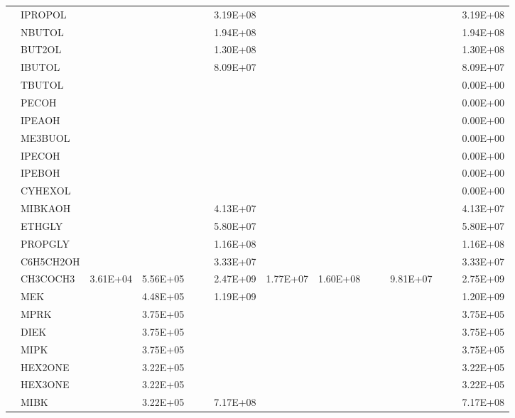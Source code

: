 \begin{longtable}{lllllllllllllll}
	 & IPROPOL &  &  &  &  & 3.19E+08 &  &  &  &  &  &  &  & 3.19E+08 \\*
	 & NBUTOL &  &  &  &  & 1.94E+08 &  &  &  &  &  &  &  & 1.94E+08 \\
	 & BUT2OL &  &  &  &  & 1.30E+08 &  &  &  &  &  &  &  & 1.30E+08 \\
	 & IBUTOL &  &  &  &  & 8.09E+07 &  &  &  &  &  &  &  & 8.09E+07 \\
	 & TBUTOL &  &  &  &  &  &  &  &  &  &  &  &  & 0.00E+00 \\
	 & PECOH &  &  &  &  &  &  &  &  &  &  &  &  & 0.00E+00 \\
	 & IPEAOH &  &  &  &  &  &  &  &  &  &  &  &  & 0.00E+00 \\
	 & ME3BUOL &  &  &  &  &  &  &  &  &  &  &  &  & 0.00E+00 \\
	 & IPECOH &  &  &  &  &  &  &  &  &  &  &  &  & 0.00E+00 \\
	 & IPEBOH &  &  &  &  &  &  &  &  &  &  &  &  & 0.00E+00 \\
	 & CYHEXOL &  &  &  &  &  &  &  &  &  &  &  &  & 0.00E+00 \\
	 & MIBKAOH &  &  &  &  & 4.13E+07 &  &  &  &  &  &  &  & 4.13E+07 \\
	 & ETHGLY &  &  &  &  & 5.80E+07 &  &  &  &  &  &  &  & 5.80E+07 \\
	 & PROPGLY &  &  &  &  & 1.16E+08 &  &  &  &  &  &  &  & 1.16E+08 \\
	 & C6H5CH2OH &  &  &  &  & 3.33E+07 &  &  &  &  &  &  &  & 3.33E+07 \\
	\hline \parbox[t]{2mm}{} & CH3COCH3 & 3.61E+04 & 5.56E+05 &  &  & 2.47E+09 & 1.77E+07 & 1.60E+08 &  &  & 9.81E+07 &  &  & 2.75E+09 \\
	 & MEK &  & 4.48E+05 &  &  & 1.19E+09 &  &  &  &  &  &  &  & 1.20E+09 \\
	 & MPRK &  & 3.75E+05 &  &  &  &  &  &  &  &  &  &  & 3.75E+05 \\
	 & DIEK &  & 3.75E+05 &  &  &  &  &  &  &  &  &  &  & 3.75E+05 \\
	 & MIPK &  & 3.75E+05 &  &  &  &  &  &  &  &  &  &  & 3.75E+05 \\
	 & HEX2ONE &  & 3.22E+05 &  &  &  &  &  &  &  &  &  &  & 3.22E+05 \\
	 & HEX3ONE &  & 3.22E+05 &  &  &  &  &  &  &  &  &  &  & 3.22E+05 \\
	 & MIBK &  & 3.22E+05 &  &  & 7.17E+08 &  &  &  &  &  &  &  & 7.17E+08 \\

\end{longtable}
